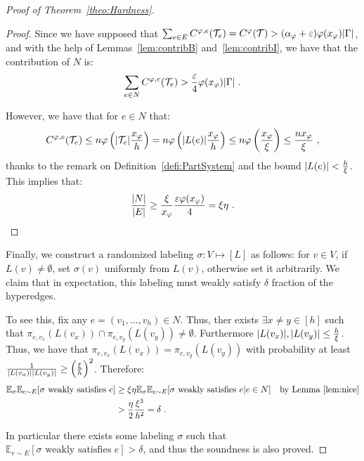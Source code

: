\begin{proof}[Proof of Theorem~\ref{theo:Hardness}]
\begin{proof}
Since we have supposed that $\sum_{e \in E} C^{\varphi,e}(\mathcal{T}_e) = C^{\varphi}(\mathcal{T}) > (\alpha_{\varphi} + \varepsilon)\varphi(x_{\varphi})\abs{\Gamma}$, and with the help of Lemmas~\ref{lem:contribB} and~\ref{lem:contribI}, we have that the contribution of $N$ is:
\[\sum_{e \in N}  C^{\varphi,e}(\mathcal{T}_e) > \frac{\varepsilon}{4}\varphi(x_{\varphi})\abs{\Gamma}\ .\]

However, we have that for $e \in N$ that:
\[ C^{\varphi,e}(\mathcal{T}_e) \leq  n\varphi\left(\abs{\mathcal{T}_e}\frac{x_{\varphi}}{h}\right) = n\varphi\left(\abs{L(e)}\frac{x_{\varphi}}{h}\right) \leq n \varphi\left(\frac{x_{\varphi}}{\xi}\right) \leq \frac{nx_{\varphi}}{\xi} \ ,\]
thanks to the remark on Definition~\ref{defi:PartSystem} and the bound $\abs{L(e)} < \frac{h}{\xi}$. This implies that:
\[\frac{\abs{N}}{\abs{E}} \geq \frac{\xi}{x_{\varphi}}\frac{\varepsilon \varphi(x_{\varphi})}{4} = \xi \eta \ .\]
\end{proof}

Finally, we construct a randomized labeling $\sigma : V \mapsto [L]$ as follows: for $v \in V$, if $L(v) \not= \emptyset$, set $\sigma(v)$ uniformly from $L(v)$, otherwise set it arbitrarily. We claim that in expectation, this labeling must weakly satisfy $\delta$ fraction of the hyperedges.

To see this, fix any $e = (v_1,\ldots,v_h) \in N$. Thus, ther exists $\exists x \not= y \in [h]$ such that $\pi_{e,v_x}(L(v_x)) \cap \pi_{e,v_y}(L(v_y)) \not= \emptyset$. Furthermore $\abs{L(v_x)},\abs{L(v_y)} \leq \frac{h}{\xi}$. Thus, we have that $\pi_{e,v_x}(L(v_x)) = \pi_{e,v_y}(L(v_y))$ with probability at least $\frac{1}{\abs{L(v_x)}\abs{L(v_y)}} \geq \left(\frac{\xi}{h}\right)^2$. Therefore:
\begin{equation}
  \begin{aligned}
    \mathbb{E}_{\sigma}\mathbb{E}_{e \sim E}[\sigma \text{ weakly satisfies } e] &\geq \xi \eta \mathbb{E}_{\sigma}\mathbb{E}_{e \sim E}[\sigma \text{ weakly satisfies } e | e \in N] \quad \text{by Lemma~\ref{lem:nice}}\\
    &> \frac{\eta}{2} \frac{\xi^3}{h^2} = \delta \ .
  \end{aligned}
\end{equation}

In particular there exists some labeling $\sigma$ such that $\mathbb{E}_{e \sim E}[\sigma \text{ weakly satisfies } e] > \delta$, and thus the soundness is also proved.
\end{proof}

